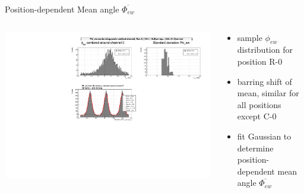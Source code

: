 \documentclass[aspectratio=169]{beamer}
\begin{document}
	\begin{frame}{Position-dependent Mean angle $\overline{\Phi_{ew}}$}
		\begin{columns}
			\begin{column}{.4\textwidth}
				
				\includegraphics[width=1.1\textwidth]{pictures/phi_ew_R0.pdf}
				
			\end{column}
			\begin{column}{.6\textwidth}
				\centering
				\begin{itemize}
					\item sample $\phi_{ew}$ distribution for position R-0
					\item barring shift of mean, similar for all positions except C-0
					\item fit Gaussian to determine position-dependent mean angle $\overline{\Phi_{ew}}$
				\end{itemize}
				
				
			\end{column}
		\end{columns}
	\end{frame}
	
\end{document}
